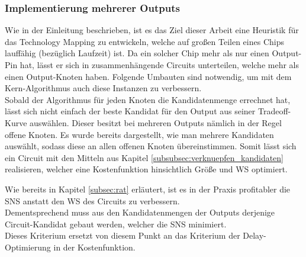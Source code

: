 \documentclass[11pt, a4paper, german]{article}
\newcommand{\TM}{Technology  Mapping }
\begin{document}
\subsubsection{Implementierung mehrerer Outputs}
\label{subsec:mehrere_outputs}
Wie in der Einleitung beschrieben, ist es das Ziel dieser Arbeit eine Heuristik für das \TM zu entwickeln, welche auf großen Teilen eines Chips lauffähig (bezüglich Laufzeit) ist. Da ein solcher Chip mehr als nur einen Output-Pin hat, lässt er sich in zusammenhängende Circuits unterteilen, welche mehr als einen Output-Knoten haben. Folgende Umbauten sind notwendig, um mit dem Kern-Algorithmus auch diese Instanzen zu verbessern.\\
Sobald der Algorithmus für jeden Knoten die Kandidatenmenge errechnet hat, l\"asst sich nicht einfach der beste Kandidat für den Output aus seiner Tradeoff-Kurve auswählen. Dieser besitzt bei mehreren Outputs nämlich in der Regel offene Knoten. 
Es wurde bereits dargestellt, wie man mehrere Kandidaten auswählt, sodass diese an allen offenen Knoten übereinstimmen. Somit lässt sich ein Circuit mit den Mitteln aus Kapitel \ref{subsubsec:verknuepfen_kandidaten} realisieren, welcher eine Kostenfunktion hinsichtlich Größe und WS optimiert. \\
\newpage

Wie bereits in Kapitel \ref{subsec:rat}  erläutert, ist es in der Praxis profitabler die SNS anstatt den WS des Circuits zu verbessern.\\
Dementsprechend muss aus den Kandidatenmengen der Outputs derjenige Circuit-Kandidat gebaut werden, welcher die SNS minimiert.\\
Dieses Kriterium ersetzt von diesem Punkt an  das Kriterium der Delay-Optimierung in der Kostenfunktion.\\
 
\end{document}
